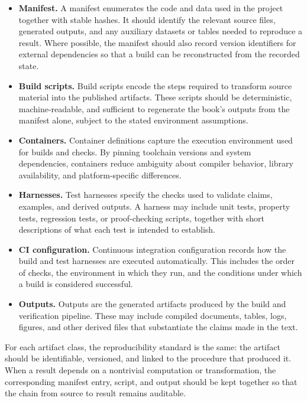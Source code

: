 \documentclass[11pt]{article}
\begin{document}
\begin{itemize}
  \item \textbf{Manifest.} A manifest enumerates the code and data used in the project together with stable hashes. It should identify the relevant source files, generated outputs, and any auxiliary datasets or tables needed to reproduce a result. Where possible, the manifest should also record version identifiers for external dependencies so that a build can be reconstructed from the recorded state.

  \item \textbf{Build scripts.} Build scripts encode the steps required to transform source material into the published artifacts. These scripts should be deterministic, machine-readable, and sufficient to regenerate the book's outputs from the manifest alone, subject to the stated environment assumptions.

  \item \textbf{Containers.} Container definitions capture the execution environment used for builds and checks. By pinning toolchain versions and system dependencies, containers reduce ambiguity about compiler behavior, library availability, and platform-specific differences.

  \item \textbf{Harnesses.} Test harnesses specify the checks used to validate claims, examples, and derived outputs. A harness may include unit tests, property tests, regression tests, or proof-checking scripts, together with short descriptions of what each test is intended to establish.

  \item \textbf{CI configuration.} Continuous integration configuration records how the build and test harnesses are executed automatically. This includes the order of checks, the environment in which they run, and the conditions under which a build is considered successful.

  \item \textbf{Outputs.} Outputs are the generated artifacts produced by the build and verification pipeline. These may include compiled documents, tables, logs, figures, and other derived files that substantiate the claims made in the text.
\end{itemize}

For each artifact class, the reproducibility standard is the same: the artifact should be identifiable, versioned, and linked to the procedure that produced it. When a result depends on a nontrivial computation or transformation, the corresponding manifest entry, script, and output should be kept together so that the chain from source to result remains auditable.
\end{document}
